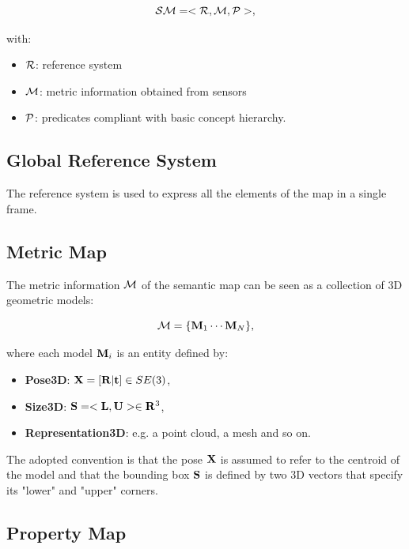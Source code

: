 \documentclass{article}
\begin{document}
	\begin{equation}
	\mathcal{SM} = < \mathcal{R}, \mathcal{M}, \mathcal{P} >,
	\end{equation}
	
	\noindent
	with:
	
	\begin{itemize}
		\item $\mathcal{R}$: reference system
		\item $\mathcal{M}$: metric information obtained from sensors
		\item $\mathcal{P}$: predicates compliant with basic concept hierarchy.
	\end{itemize}
	
	\subsection{Global Reference System}	
	
	The reference system is used to express all the elements of the map in a single frame.
	
	\subsection{Metric Map}	
	
	The metric information $\mathcal{M}$ of the semantic map can be seen as a collection of 3D geometric models:
	
	\begin{equation}
	\mathcal{M} = \{\mathbf{M}_1 \cdots \mathbf{M}_N\},
	\end{equation}
	
	\noindent	
	where each model $\mathbf{M}_i$ is an entity defined by:
	
	\begin{itemize}
		\item {\bf Pose3D}: $\mathbf{X} = [ \mathbf{R} | \mathbf{t}] \in SE(3)$,
		\item {\bf Size3D}: $\mathbf{S} = <\mathbf{L} ,\mathbf{U}> \in \mathbf{R}^3 $,
		\item {\bf Representation3D}: e.g. a point cloud, a mesh and so on.
	\end{itemize}
	
	The adopted convention is that the pose $\mathbf{X}$ is assumed to refer to the centroid of the model and that the bounding box $\mathbf{S}$ is defined by two 3D vectors that specify its "lower" and "upper" corners.
	
	\subsection{Property Map}	
	
\end{document}

